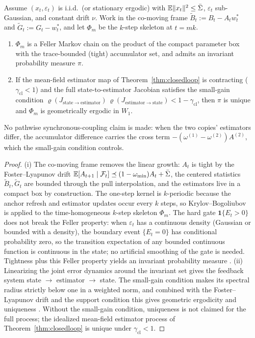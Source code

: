 \begin{proposition}
\label{prop:ergodic}
Assume $(x_t,\varepsilon_t)$ is i.i.d.\ (or stationary ergodic) with $\mathbb{E}\|x_t\|^2 \le \bar\Sigma$, $\varepsilon_t$ sub-Gaussian, and constant drift $\nu$.
Work in the co-moving frame $\tilde B_t := B_t - A_t w^*_t$ and $\tilde G_t := G_t - w^*_t$, and let $\Phi_m$ be the $k$-step skeleton at $t = mk$.
\begin{enumerate}
\item[(i)] $\Phi_m$ is a Feller Markov chain on the product of the compact parameter box with the trace-bounded (tight) accumulator set, and admits an invariant probability measure $\pi$.
\item[(ii)] If the mean-field estimator map of Theorem~\ref{thm:closedloop} is contracting ($\gamma_{\mathrm{cl}}<1$) and the full state-to-estimator Jacobian satisfies the small-gain condition $\varrho(J_{\mathrm{state}\to\mathrm{estimator}})\,\varrho(J_{\mathrm{estimator}\to\mathrm{state}}) < 1-\gamma_{\mathrm{cl}}$, then $\pi$ is unique and $\Phi_m$ is geometrically ergodic in $W_1$.
\end{enumerate}
No pathwise synchronous-coupling claim is made: when the two copies' estimators differ, the accumulator difference carries the cross term $-(\omega^{(1)}-\omega^{(2)})A^{(2)}$, which the small-gain condition controls.
\end{proposition}
\begin{proof}
(i) The co-moving frame removes the linear growth: $A_t$ is tight by the Foster--Lyapunov drift $\mathbb{E}[A_{t+1}\mid\mathcal F_t]\preceq(1-\omega_{\min})A_t+\bar\Sigma$, the centered statistics $\tilde B_t,\tilde G_t$ are bounded through the pull interpolation, and the estimators live in a compact box by construction.
The one-step kernel is $k$-periodic because the anchor refresh and estimator updates occur every $k$ steps, so Krylov--Bogoliubov is applied to the time-homogeneous $k$-step skeleton $\Phi_m$.
The hard gate $\mathbf 1\{E_t>0\}$ does not break the Feller property: when $\varepsilon_t$ has a continuous density (Gaussian or bounded with a density), the boundary event $\{E_t=0\}$ has conditional probability zero, so the transition expectation of any bounded continuous function is continuous in the state; no artificial smoothing of the gate is needed.
Tightness plus this Feller property yields an invariant probability measure \citep{meyn2009}.
(ii) Linearizing the joint error dynamics around the invariant set gives the feedback system state $\to$ estimator $\to$ state. The small-gain condition makes its spectral radius strictly below one in a weighted norm, and combined with the Foster--Lyapunov drift and the support condition this gives geometric ergodicity and uniqueness \citep[Ch.~18]{meyn2009}.
Without the small-gain condition, uniqueness is not claimed for the full process; the idealized mean-field estimator process of Theorem~\ref{thm:closedloop} is unique under $\gamma_{\mathrm{cl}}<1$.
\end{proof}

